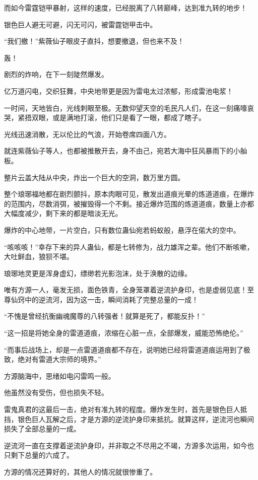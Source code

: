 \begin{this_body}
而如今雷霆铠甲暴射，这样的速度，已经脱离了八转巅峰，达到准九转的地步！

银色巨人避无可避，闪无可闪，被雷霆铠甲击中。

“我们撤！”紫薇仙子眼皮子直抖，想要撤退，但也来不及！

轰！

剧烈的炸响，在下一刻陡然爆发。

亿万道闪电，交织狂舞，中央地带更是因为雷电太过浓郁，形成雷池电浆！

一时间，天地皆白，光线刺眼至极。无数仰望天空的毛民凡人们，在这一刻痛嚎哀哭，紧捂双眼，或是满地打滚，他们只是看了一眼，都成了瞎子。

光线迅速消散，无以伦比的气浪，开始卷席四面八方。

就连紫薇仙子等人，也都被推散开去，身不由己，宛若大海中狂风暴雨下的小舢板。

整片云盖大陆从中央，炸出一个巨大的空洞，数万里方圆。

整个琅琊福地都在剧烈颤抖，原本肉眼可见，散发出道痕光晕的炼道道痕，在爆炸的范围内，尽数消弭，被摧毁得一个不剩。接近爆炸范围的炼道道痕，数量上亦都大幅度减少，剩下来的都是暗淡无光。

爆炸的中心地带，一片空白，只有数位蛊仙宛若蚂蚁般，悬浮在偌大的空中。

“咳咳咳！”幸存下来的异人蛊仙，都是七转修为，战力雄浑之辈。他们不断咳嗽，大吐鲜血，狼狈不堪。

琅琊地灵更是浑身虚幻，缥缈若光影泡沫，处于涣散的边缘。

唯有方源一人，毫发无损，面色铁青，全身笼罩着逆流护身印，也是虚弱见底！至尊仙窍中的逆流河，因为这一击，瞬间消耗了完整总量的一成！

“不愧是曾经抗衡幽魂魔尊的八转强者！就算是死了，都能反扑！”

“这一招是将她全身的雷道道痕，浓缩在心脏一点，全部爆发，威能恐怖绝伦。”

“而事后战场上，却是一点雷道道痕都不存在，说明她已经将雷道道痕运用到了极致，绝对有雷道大宗师的境界。”

方源脑海中，思绪如电闪雷鸣一般。

他虽然没有受伤，但也损失不轻。

雷鬼真君的这最后一击，绝对有准九转的程度。爆炸发生时，首先是银色巨人抵挡，银色巨人瓦解之后，才是方源的逆流护身印来抵抗。就算这样，逆流河也瞬间损失了全部总量的一成。

逆流河一直在支撑着逆流护身印，并非取之不尽用之不竭，方源多次运用，如今也只剩下总量的六成了。

方源的情况还算好的，其他人的情况就很惨重了。


\end{this_body}
